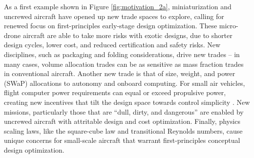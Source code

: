 \documentclass[12pt,vi,oneside,table]{report}
\begin{document}
    As a first example shown in Figure \ref{fig:motivation_2a}, miniaturization and uncrewed aircraft have opened up new trade spaces to explore, calling for renewed focus on first-principles early-stage design optimization. These micro-drone aircraft are able to take more risks with exotic designs, due to shorter design cycles, lower cost, and reduced certification and safety risks. New disciplines, such as packaging and folding considerations, drive new trades -- in many cases, volume allocation trades can be as sensitive as mass fraction trades in conventional aircraft. Another new trade is that of size, weight, and power (SWaP) allocations to autonomy and onboard computing. For small air vehicles, flight computer power requirements can equal or exceed propulsive power, creating new incentives that tilt the design space towards control simplicity \cite{sudhakar_balancing_2020}. New missions, particularly those that are ``dull, dirty, and dangerous'' are enabled by uncrewed aircraft with attritable design and cost optimization. Finally, physics scaling laws, like the square-cube law and transitional Reynolds numbers, cause unique concerns for small-scale aircraft that warrant first-principles conceptual design optimization.
\end{document}
